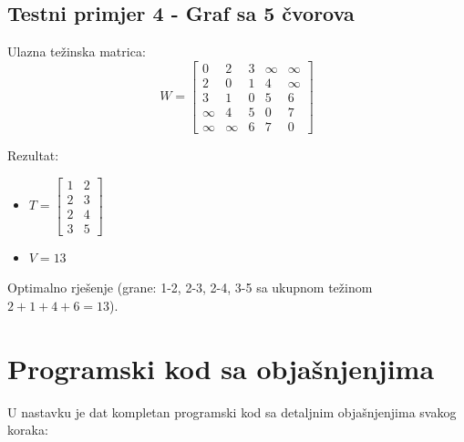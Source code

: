 \documentclass[12pt,a4paper]{article}
\begin{document}
\subsection{Testni primjer 4 - Graf sa 5 čvorova}

Ulazna težinska matrica:
\begin{equation}
W = \begin{bmatrix}
0 & 2 & 3 & \infty & \infty \\
2 & 0 & 1 & 4 & \infty \\
3 & 1 & 0 & 5 & 6 \\
\infty & 4 & 5 & 0 & 7 \\
\infty & \infty & 6 & 7 & 0
\end{bmatrix}
\end{equation}

Rezultat:
\begin{itemize}
\item $T = \begin{bmatrix} 1 & 2 \\ 2 & 3 \\ 2 & 4 \\ 3 & 5 \end{bmatrix}$
\item $V = 13$
\end{itemize}

Optimalno rješenje (grane: 1-2, 2-3, 2-4, 3-5 sa ukupnom težinom $2 + 1 + 4 + 6 = 13$).

\section{Programski kod sa objašnjenjima}

U nastavku je dat kompletan programski kod sa detaljnim objašnjenjima svakog koraka:
\end{document}
